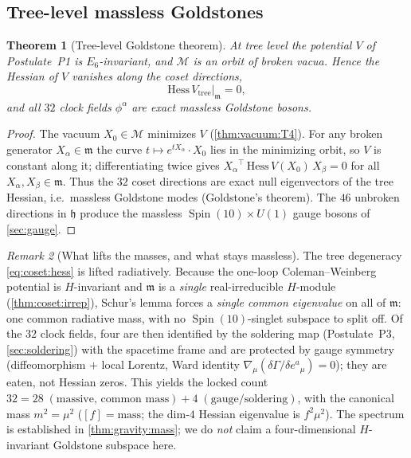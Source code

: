 \documentclass[11pt]{article}
\theoremstyle{plain}
\newtheorem{theorem}{Theorem}[section]
\theoremstyle{definition}
\theoremstyle{remark}
\newtheorem{remark}[theorem]{Remark}
\newcommand{\Spin}{\operatorname{Spin}}
\begin{document}
\subsection{Tree-level massless Goldstones}
\label{sec:coset:goldstone}

\begin{theorem}[Tree-level Goldstone theorem]\label{thm:coset:goldstone}
At tree level the potential $V$ of Postulate~P1 is $E_{6}$-invariant, and
$\mathcal M$ is an orbit of broken vacua. Hence the Hessian of $V$ vanishes
along the coset directions,
\begin{equation}\label{eq:coset:hess}
  \mathrm{Hess}\,V_{\mathrm{tree}}\big|_{\mathfrak m} = 0,
\end{equation}
and all $32$ clock fields $\phi^{\alpha}$ are exact massless Goldstone bosons.
\end{theorem}

\begin{proof}
The vacuum $X_{0}\in\mathcal M$ minimizes $V$ (\autoref{thm:vacuum:T4}). For any
broken generator $X_{\alpha}\in\mathfrak m$ the curve
$t\mapsto e^{tX_{\alpha}}\!\cdot X_{0}$ lies in the minimizing orbit, so $V$ is
constant along it; differentiating twice gives
$X_{\alpha}{}^{\!\top}\,\mathrm{Hess}\,V(X_{0})\,X_{\beta}=0$ for all
$X_{\alpha},X_{\beta}\in\mathfrak m$. Thus the $32$ coset directions are exact
null eigenvectors of the tree Hessian, i.e.\ massless Goldstone modes
(Goldstone's theorem). The $46$ unbroken directions in $\mathfrak h$ produce the
massless $\Spin(10)\times U(1)$ gauge bosons of \autoref{sec:gauge}.
\end{proof}

\begin{remark}[What lifts the masses, and what stays massless]\label{rem:coset:loop}
The tree degeneracy \eqref{eq:coset:hess} is lifted radiatively. Because the
one-loop Coleman--Weinberg potential is $H$-invariant and $\mathfrak m$ is a
\emph{single} real-irreducible $H$-module (\autoref{thm:coset:irrep}), Schur's
lemma forces a \emph{single common eigenvalue} on all of $\mathfrak m$: one
common radiative mass, with no $\Spin(10)$-singlet subspace to split off. Of the
$32$ clock fields, four are then identified by the soldering map (Postulate~P3,
\autoref{sec:soldering}) with the spacetime frame and are protected by gauge
symmetry (diffeomorphism $+$ local Lorentz, Ward identity
$\nabla_{\mu}(\delta\Gamma/\delta e^{a}{}_{\mu})=0$); they are eaten, not Hessian
zeros. This yields the locked count $32 = 28\;(\text{massive, common mass})
+ 4\;(\text{gauge/soldering})$, with the canonical mass $m^{2}=\mu^{2}$
($[f]=\text{mass}$; the dim-$4$ Hessian eigenvalue is $f^{2}\mu^{2}$). The
spectrum is established in \autoref{thm:gravity:mass}; we do \emph{not} claim a
four-dimensional $H$-invariant Goldstone subspace here.
\end{remark}
\end{document}
